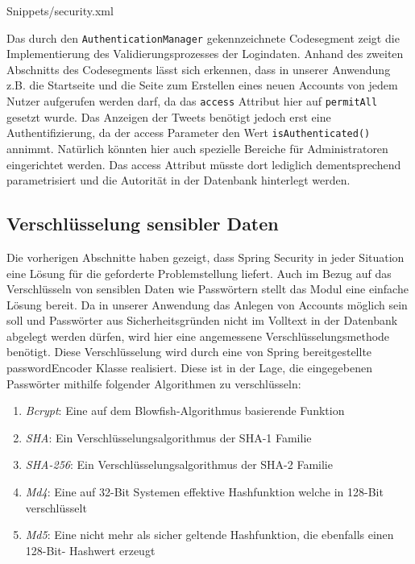 {Snippets/security.xml}

Das durch den \texttt{AuthenticationManager} gekennzeichnete Codesegment zeigt die Implementierung des 
Validierungsprozesses der Logindaten.
Anhand des zweiten Abschnitts des Codesegments lässt sich erkennen, dass in unserer Anwendung z.B. die 
Startseite und die Seite zum Erstellen eines neuen Accounts von jedem Nutzer aufgerufen werden darf, 
da das \texttt{access} Attribut hier auf \texttt{permitAll} gesetzt wurde. Das Anzeigen der Tweets benötigt 
jedoch erst eine Authentifizierung, da der access Parameter den Wert \texttt{isAuthenticated()} 
annimmt. Natürlich könnten hier auch spezielle Bereiche für Administratoren eingerichtet werden. Das 
access Attribut müsste dort lediglich dementsprechend parametrisiert und die Autorität in der 
Datenbank hinterlegt werden.

\subsection{Verschlüsselung sensibler Daten}\label{subsec:secure_login}

Die vorherigen Abschnitte haben gezeigt, dass Spring Security in jeder Situation eine Lösung für die 
geforderte Problemstellung liefert. Auch im Bezug auf das Verschlüsseln von sensiblen Daten wie 
Passwörtern stellt das Modul eine einfache Lösung bereit. Da in unserer Anwendung das Anlegen von 
Accounts möglich sein soll und Passwörter aus Sicherheitsgründen nicht im Volltext in der Datenbank 
abgelegt werden dürfen, wird hier eine angemessene Verschlüsselungsmethode benötigt. Diese 
Verschlüsselung wird durch eine von Spring bereitgestellte passwordEncoder Klasse realisiert. Diese 
ist in der Lage, die eingegebenen Passwörter mithilfe folgender Algorithmen zu verschlüsseln:

\begin{enumerate}
  \item \textit{Bcrypt}: Eine auf dem Blowfish-Algorithmus basierende Funktion
  \item \textit{SHA}: Ein Verschlüsselungsalgorithmus der SHA-1 Familie
  \item \textit{SHA-256}: Ein Verschlüsselungsalgorithmus der SHA-2 Familie
  \item \textit{Md4}: Eine auf 32-Bit Systemen effektive Hashfunktion welche in 128-Bit verschlüsselt
  \item \textit{Md5}: Eine nicht mehr als sicher geltende Hashfunktion, die ebenfalls einen 128-Bit- 	Hashwert erzeugt
\end{enumerate}

